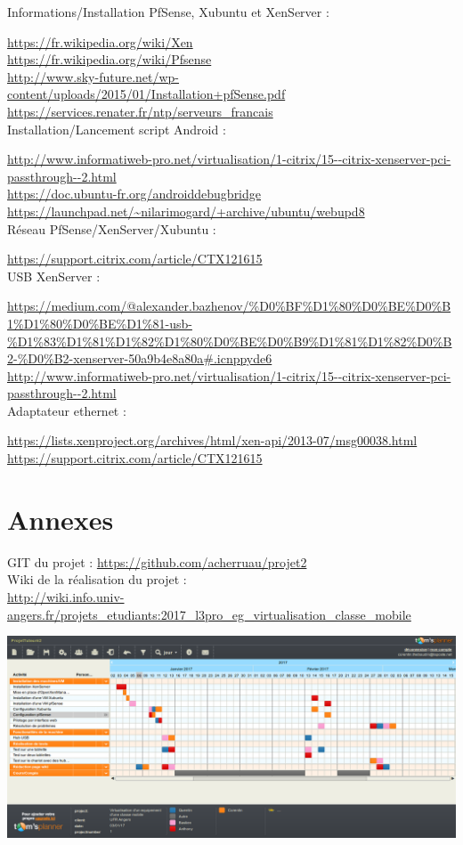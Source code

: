 \documentclass[a4paper,12pt]{extarticle}
\begin{document}
Informations/Installation PfSense, Xubuntu et XenServer :

\url{https://fr.wikipedia.org/wiki/Xen}\\
\url{https://fr.wikipedia.org/wiki/Pfsense}\\
\url{http://www.sky-future.net/wp-content/uploads/2015/01/Installation+pfSense.pdf}\\
\url{https://services.renater.fr/ntp/serveurs_francais}\\

Installation/Lancement script Android :

\url{http://www.informatiweb-pro.net/virtualisation/1-citrix/15--citrix-xenserver-pci-passthrough--2.html}\\
\url{https://doc.ubuntu-fr.org/androiddebugbridge}\\
\url{https://launchpad.net/~nilarimogard/+archive/ubuntu/webupd8}\\

Réseau PfSense/XenServer/Xubuntu :

\url{https://support.citrix.com/article/CTX121615}\\

USB XenServer :

\url{https://medium.com/@alexander.bazhenov/\%D0\%BF\%D1\%80\%D0\%BE\%D0\%B1\%D1\%80\%D0\%BE\%D1\%81-usb-\%D1\%83\%D1\%81\%D1\%82\%D1\%80\%D0\%BE\%D0\%B9\%D1\%81\%D1\%82\%D0\%B2-\%D0\%B2-xenserver-50a9b4e8a80a#.icnppyde6}\\
\url{http://www.informatiweb-pro.net/virtualisation/1-citrix/15--citrix-xenserver-pci-passthrough--2.html}\\

Adaptateur ethernet :

\url{https://lists.xenproject.org/archives/html/xen-api/2013-07/msg00038.html}\\
\url{https://support.citrix.com/article/CTX121615}\\

\clearpage

\section{Annexes}

GIT du projet :
\url{https://github.com/acherruau/projet2}\\

Wiki de la réalisation du projet :\\ 
\url{http://wiki.info.univ-angers.fr/projets_etudiants:2017_l3pro_eg_virtualisation_classe_mobile}\\

\begin{center}
\includegraphics[scale=0.70, angle=270]{Gantt2}
\end{center}
\end{document}
